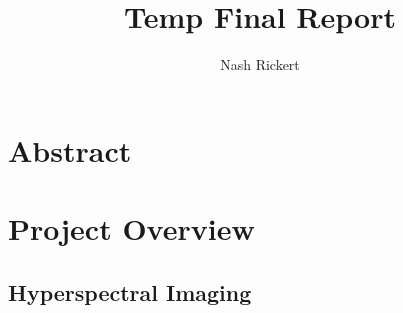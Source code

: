 \documentclass{article}
\title{Temp Final Report}
\author{Nash Rickert}
\begin{document}
\maketitle

\section{Abstract}

\section{Project Overview}
\subsection{Hyperspectral Imaging}
\end{document}
